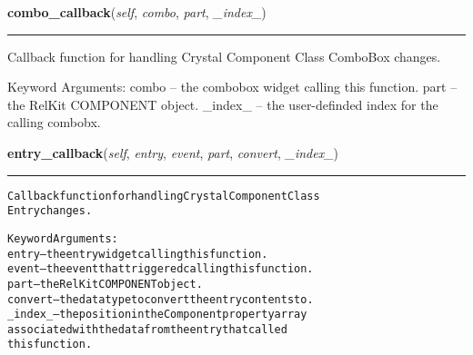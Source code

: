     \label{reliafree:miscellaneous:crystal:Crystal:combo_callback}

    \vspace{0.5ex}

\hspace{.8\funcindent}\begin{boxedminipage}{\funcwidth}

    \raggedright \textbf{combo\_callback}(\textit{self}, \textit{combo}, \textit{part}, \textit{\_index\_})

    \vspace{-1.5ex}

    \rule{\textwidth}{0.5\fboxrule}
\setlength{\parskip}{2ex}
    Callback function for handling Crystal Component Class ComboBox 
    changes.

    Keyword Arguments: combo   -- the combobox widget calling this 
    function. part    -- the RelKit COMPONENT object. \_index\_ -- the 
    user-definded index for the calling combobx.

\setlength{\parskip}{1ex}
    \end{boxedminipage}

    \label{reliafree:miscellaneous:crystal:Crystal:entry_callback}

    \vspace{0.5ex}

\hspace{.8\funcindent}\begin{boxedminipage}{\funcwidth}

    \raggedright \textbf{entry\_callback}(\textit{self}, \textit{entry}, \textit{event}, \textit{part}, \textit{convert}, \textit{\_index\_})

    \vspace{-1.5ex}

    \rule{\textwidth}{0.5\fboxrule}
\setlength{\parskip}{2ex}
\begin{alltt}
Callback function for handling Crystal Component Class
Entry changes.

Keyword Arguments:
entry   -- the entry widget calling this function.
event   -- the event that triggered calling this function.
part    -- the RelKit COMPONENT object.
convert -- the data type to convert the entry contents to.
\_index\_ -- the position in the Component property array
           associated with the data from the entry that called
           this function.
\end{alltt}

\setlength{\parskip}{1ex}
    \end{boxedminipage}

